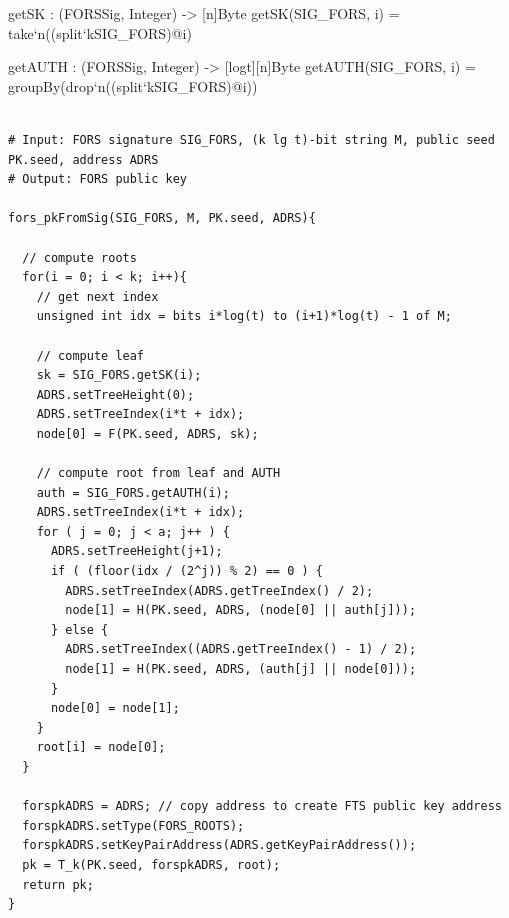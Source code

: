 \begin{code}
  getSK : (FORSSig, Integer) -> [n]Byte
  getSK(SIG_FORS, i) = take`{n}((split`{k}SIG_FORS)@i)

  getAUTH : (FORSSig, Integer) -> [logt][n]Byte
  getAUTH(SIG_FORS, i) = groupBy(drop`{n}((split`{k}SIG_FORS)@i))
\end{code}
   
   
\begin{lstlisting}[breaklines=true, label=alg:fors:rootFromSig, language=pseudoc,
                   caption=\forspkfromsig\ -- 
                   Compute a \fors public key from a \fors signature.]

# Input: FORS signature SIG_FORS, (k lg t)-bit string M, public seed PK.seed, address ADRS
# Output: FORS public key

fors_pkFromSig(SIG_FORS, M, PK.seed, ADRS){
     
  // compute roots
  for(i = 0; i < k; i++){
    // get next index
    unsigned int idx = bits i*log(t) to (i+1)*log(t) - 1 of M;
    
    // compute leaf
    sk = SIG_FORS.getSK(i);
    ADRS.setTreeHeight(0);
    ADRS.setTreeIndex(i*t + idx);
    node[0] = F(PK.seed, ADRS, sk);
     
    // compute root from leaf and AUTH
    auth = SIG_FORS.getAUTH(i);
    ADRS.setTreeIndex(i*t + idx);
    for ( j = 0; j < a; j++ ) {
      ADRS.setTreeHeight(j+1);
      if ( (floor(idx / (2^j)) % 2) == 0 ) {
        ADRS.setTreeIndex(ADRS.getTreeIndex() / 2);
        node[1] = H(PK.seed, ADRS, (node[0] || auth[j]));
      } else {
        ADRS.setTreeIndex((ADRS.getTreeIndex() - 1) / 2);
        node[1] = H(PK.seed, ADRS, (auth[j] || node[0]));
      }
      node[0] = node[1];
    }
    root[i] = node[0];
  }

  forspkADRS = ADRS; // copy address to create FTS public key address
  forspkADRS.setType(FORS_ROOTS);
  forspkADRS.setKeyPairAddress(ADRS.getKeyPairAddress());
  pk = T_k(PK.seed, forspkADRS, root);
  return pk;
}
\end{lstlisting}

